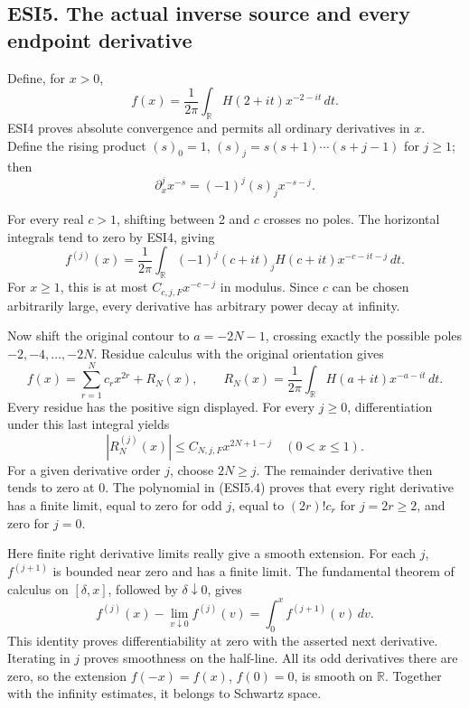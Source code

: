 \subsection{ESI5. The actual inverse source and every endpoint
derivative}\label{esi5.-the-actual-inverse-source-and-every-endpoint-derivative}

Define, for \(x>0\), \[
f(x)=\frac1{2\pi}\int_{\mathbb R}H(2+it)x^{-2-it}\,dt.
\tag{ESI5.1}
\] ESI4 proves absolute convergence and permits all ordinary derivatives
in \(x\). Define the rising product \((s)_0=1\),
\((s)_j=s(s+1)\cdots(s+j-1)\) for \(j\ge1\); then \[
\partial_x^j x^{-s}=(-1)^j(s)_j x^{-s-j}.
\tag{ESI5.2}
\]

For every real \(c>1\), shifting between 2 and \(c\) crosses no poles.
The horizontal integrals tend to zero by ESI4, giving \[
f^{(j)}(x)=\frac1{2\pi}\int_{\mathbb R}
(-1)^j(c+it)_jH(c+it)x^{-c-it-j}\,dt.
\tag{ESI5.3}
\] For \(x\ge1\), this is at most \(C_{c,j,F}x^{-c-j}\) in modulus.
Since \(c\) can be chosen arbitrarily large, every derivative has
arbitrary power decay at infinity.

Now shift the original contour to \(a=-2N-1\), crossing exactly the
possible poles \(-2,-4,\ldots,-2N\). Residue calculus with the original
orientation gives \[
f(x)=\sum_{r=1}^N c_r x^{2r}+R_N(x),
\qquad
R_N(x)=\frac1{2\pi}\int_{\mathbb R}H(a+it)x^{-a-it}\,dt.
\tag{ESI5.4}
\] Every residue has the positive sign displayed. For every \(j\ge0\),
differentiation under this last integral yields \[
|R_N^{(j)}(x)|\le C_{N,j,F}x^{2N+1-j}
\quad(0<x\le1).
\tag{ESI5.5}
\] For a given derivative order \(j\), choose \(2N\ge j\). The remainder
derivative then tends to zero at 0. The polynomial in (ESI5.4) proves
that every right derivative has a finite limit, equal to zero for odd
\(j\), equal to \((2r)!c_r\) for \(j=2r\ge2\), and zero for \(j=0\).

Here finite right derivative limits really give a smooth extension. For
each \(j\), \(f^{(j+1)}\) is bounded near zero and has a finite limit.
The fundamental theorem of calculus on \([\delta,x]\), followed by
\(\delta\downarrow0\), gives \[
f^{(j)}(x)-\lim_{v\downarrow0}f^{(j)}(v)
=\int_0^x f^{(j+1)}(v)\,dv.
\tag{ESI5.6}
\] This identity proves differentiability at zero with the asserted next
derivative. Iterating in \(j\) proves smoothness on the half-line. All
its odd derivatives there are zero, so the extension \(f(-x)=f(x)\),
\(f(0)=0\), is smooth on \(\mathbb R\). Together with the infinity
estimates, it belongs to Schwartz space.

